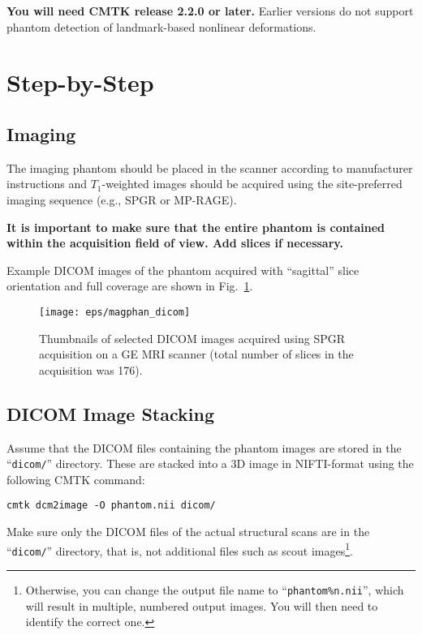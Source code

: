 \documentclass{InsightArticle}
\begin{document}
{\bf You will need CMTK release 2.2.0 or later.} Earlier versions do not
  support phantom detection of landmark-based nonlinear deformations.

\section{Step-by-Step}

\subsection{Imaging}

The imaging phantom should be placed in the scanner according to manufacturer
instructions and $T_1$-weighted images should be acquired using the
site-preferred imaging sequence (e.g., SPGR or MP-RAGE). 

{\bf It is important to make sure that the entire phantom is contained within
  the acquisition field of view. Add slices if necessary.}

Example DICOM images of the phantom acquired with ``sagittal'' slice
orientation and full coverage are shown in Fig.~\ref{fig:PhantomDICOM}.

\begin{figure}[tbp]
\centerline{\texttt{[image: eps/magphan\_dicom]}}
\caption{Thumbnails of selected DICOM images acquired using SPGR acquisition
  on a GE MRI scanner (total number of slices in the acquisition was 176).}
\label{fig:PhantomDICOM}
\end{figure}

\subsection{DICOM Image Stacking}

Assume that the DICOM files containing the phantom images are stored in the
``\texttt{dicom/}'' directory. These are stacked into a 3D image in
NIFTI-format using the following CMTK command:
\begin{verbatim}
cmtk dcm2image -O phantom.nii dicom/
\end{verbatim}
Make sure only the DICOM files of the actual structural scans are in the
``\texttt{dicom/}'' directory, that is, not additional files such as scout
images\footnote{Otherwise, you can change the output file name to
  ``\texttt{phantom\%n.nii}'', which will result in multiple, numbered output
  images. You will then need to identify the correct one.}.
\end{document}
